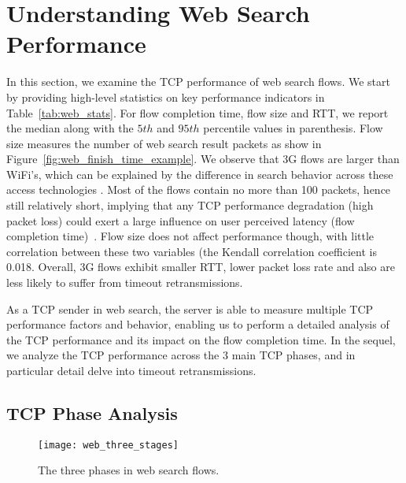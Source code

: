 
\section{Understanding Web Search Performance}
\label{sec:web_search}

In this section, we examine the TCP performance of web search flows. We start by providing high-level statistics on key performance indicators in Table~\ref{tab:web_stats}. For flow completion time, flow size and RTT, we report the median along with the $5th$ and $95th$ percentile values in parenthesis. Flow size measures the number of web search result packets as show in Figure~\ref{fig:web_finish_time_example}. We observe that 3G flows are larger than WiFi's, which can be explained by the difference in search behavior across these access technologies \cite{Song:2013:EEU:2488388.2488493}. Most of the flows contain no more than 100 packets, hence still relatively short, implying that any TCP performance degradation (\eg high packet loss) could exert a large influence on user perceived latency (\ie flow completion time)~\cite{flach2013reducing}. Flow size does not affect performance though, with little correlation between these two variables (the Kendall correlation coefficient is 0.018. Overall, 3G flows exhibit smaller RTT, lower packet loss rate and also are less likely to suffer from timeout retransmissions.

As a TCP sender in web search, the server is able to measure multiple TCP performance factors and behavior, enabling us to perform a detailed analysis of the TCP performance and its impact on the flow completion time. In the sequel, we analyze the TCP performance across the 3 main TCP phases, and in particular detail delve into timeout retransmissions.

\subsection{TCP Phase Analysis}

\begin{figure}[th]
\centering
\texttt{[image: web\_three\_stages]}
\caption{The three phases in web search flows.}
\label{fig:web_three_stages}
\minsqueeze
\end{figure}

